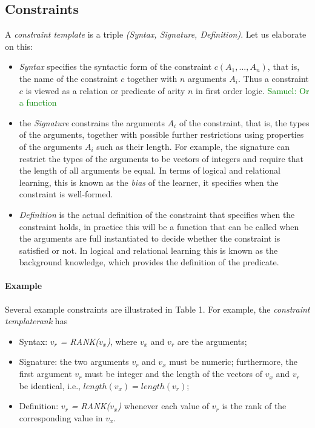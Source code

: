 \documentclass{ecai}
\newcommand{\samuel}[1]{\textcolor{green}{{\sc Samuel:} #1}\xspace}
\newcommand{\format}[1]{\textit{#1}\xspace}
\newcommand{\template}{\format{constraint template}}
\newcommand{\CName}{Syntax\xspace}
\newcommand{\CSignature}{Signature\xspace}
\newcommand{\CFunction}{Definition\xspace}
\newcommand{\groups}{\ensuremath{\mathcal{G}}\xspace}
\begin{document}
\subsection{Constraints}
A \template is a triple \textit{(\CName, \CSignature, \CFunction)}.
Let us elaborate on this:
\begin{itemize}
\item
\textit{\CName}  specifies the syntactic form of the constraint $c(A_1, ...,A_n)$, that is, the name of the constraint $c$ together
with $n$ arguments $A_i$. Thus a constraint $c$ is viewed as a relation or predicate of arity $n$ in first order logic.
\samuel{Or a function}
\item the \textit{\CSignature} constrains the arguments $A_i$ of the constraint, that is, the types of the arguments, together
with possible further restrictions using properties of the arguments $A_i$ such as their length.  For example, the signature can restrict the types of the arguments
to be vectors of integers and require that  the length of all arguments be equal.  In terms of logical and relational learning, this is known as the {\em bias} of the learner,
it specifies when the constraint is well-formed.
  \item \textit{\CFunction} is the actual definition of the constraint that specifies when the constraint holds, in practice this will be a function that can be called when
the arguments are full instantiated to decide whether the constraint is satisfied or not. In logical and relational learning this is known as the background knowledge, which provides the definition of the predicate.
\end{itemize}

\paragraph{Example}
Several example constraints are illustrated in Table 1.  For example, the \template \textit{rank} has
\begin{itemize}
\item \CName: \textit{$v_r$ = RANK($v_x$)}, where $v_x$ and $v_r$ are the arguments;
\item \CSignature: the two arguments $v_r$ and $v_x$ must be numeric; furthermore, the first argument $v_r$ must be integer and the length of the vectors
of $v_x$ and $v_r$ be identical, i.e., $length(v_x) = length(v_r)$;
\item \CFunction: \textit{$v_r$ = RANK($v_x$)} whenever each value of $v_r$ is the rank of the corresponding value in $v_x$.
\end{itemize}
\end{document}
